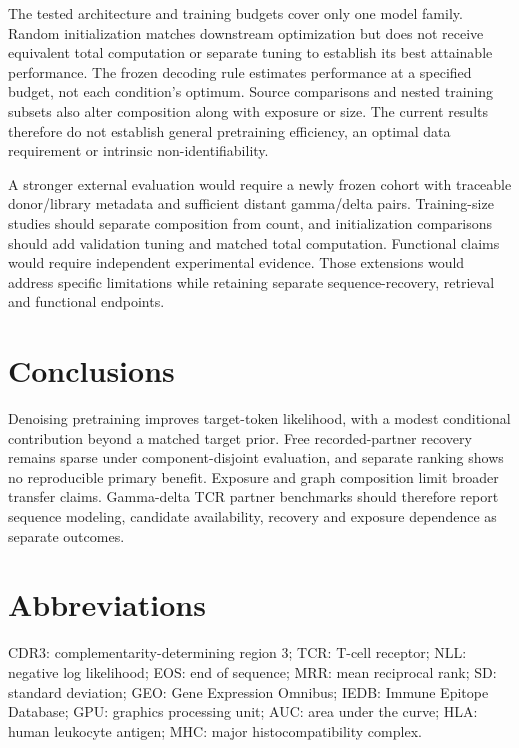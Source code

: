 \documentclass[a4paper,11pt]{article}
\begin{document}
The tested architecture and training budgets cover only one model family.
Random initialization matches downstream optimization but does not receive
equivalent total computation or separate tuning to establish its best
attainable performance. The frozen decoding rule estimates performance at a
specified budget, not each condition's optimum. Source comparisons and nested
training subsets also alter composition along with exposure or size.
The current results therefore do not establish general pretraining efficiency,
an optimal data requirement or intrinsic non-identifiability.

A stronger external evaluation would require a newly frozen cohort with
traceable donor/library metadata and sufficient distant gamma/delta pairs.
Training-size studies should separate composition from count, and
initialization comparisons should add validation tuning and matched total
computation. Functional claims would require independent experimental
evidence. Those extensions would address specific limitations while retaining
separate sequence-recovery, retrieval and functional endpoints.

\section{Conclusions}
Denoising pretraining improves target-token likelihood, with a modest
conditional contribution beyond a matched target prior. Free recorded-partner
recovery remains sparse under component-disjoint evaluation, and separate
ranking shows no reproducible primary benefit. Exposure and graph composition
limit broader transfer claims. Gamma-delta TCR partner benchmarks should
therefore report sequence modeling, candidate availability, recovery and
exposure dependence as separate outcomes.

\section*{Abbreviations}
CDR3: complementarity-determining region 3; TCR: T-cell receptor;
NLL: negative log likelihood; EOS: end of sequence;
MRR: mean reciprocal rank; SD: standard deviation;
GEO: Gene Expression Omnibus; IEDB: Immune Epitope Database;
GPU: graphics processing unit; AUC: area under the curve;
HLA: human leukocyte antigen; MHC: major histocompatibility complex.
\end{document}
